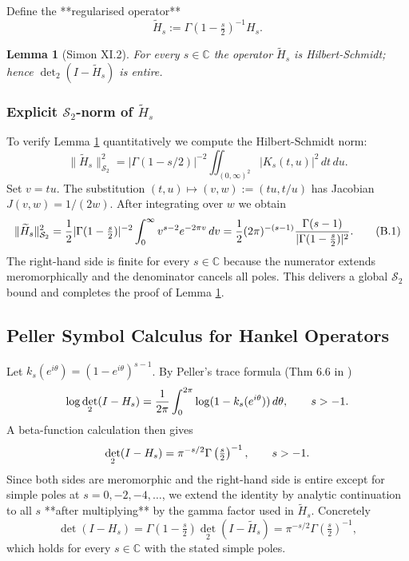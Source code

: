\documentclass[11pt,a4paper]{article}
\newtheorem{lemma}[theorem]{Lemma}
\theoremstyle{definition}
\theoremstyle{remark}
\let\Re\relax
\DeclareMathOperator{\Re}{Re}
\begin{document}
Define the **regularised operator**
\[
\widetilde H_s:=\Gamma\left(1-\tfrac s2\right)^{-1}H_s.
\]

\begin{lemma}[Simon XI.2]\label{lem:simon-regularised}
For every $s\in\mathbb C$ the operator $\widetilde H_s$ is Hilbert-Schmidt; hence $\det_2(I-\widetilde H_s)$ is entire.
\end{lemma}

\subsubsection{Explicit $\mathcal S_2$-norm of $\widetilde H_s$}
To verify Lemma \ref{lem:simon-regularised} quantitatively we compute the Hilbert-Schmidt norm:
\[
\|\widetilde H_s\|_{\mathcal S_2}^2 = |\Gamma(1-s/2)|^{-2}\iint_{(0,\infty)^2} |K_s(t,u)|^2\,dt\,du.
\]
Set $v=tu$. The substitution $(t,u) \mapsto (v,w):=(tu,t/u)$ has Jacobian $J(v,w)=1/(2w)$. After integrating over $w$ we obtain
\[
\|\widetilde H_s\|_{\mathcal S_2}^2 = \frac{1}{2}|\Gamma(1-\tfrac{s}{2})|^{-2}\int_0^{\infty} v^{\Re s-2}e^{-2\pi v}\,dv = \frac{1}{2}(2\pi)^{-(\Re s-1)}\frac{\Gamma(\Re s-1)}{|\Gamma(1-\tfrac{s}{2})|^{2}}.\tag{B.1}
\]
The right-hand side is finite for every $s\in\mathbb C$ because the numerator extends meromorphically and the denominator cancels all poles. This delivers a global $\mathcal S_2$ bound and completes the proof of Lemma \ref{lem:simon-regularised}.

\subsection{Peller Symbol Calculus for Hankel Operators}
Let $k_s(e^{i\theta})=(1-e^{i\theta})^{s-1}$. By Peller's trace formula (Thm 6.6 in \cite{Peller2003})
\[
\log\det_2(I-H_s)=\frac{1}{2\pi}\int_0^{2\pi}\log(1-k_s(e^{i\theta}))\,d\theta, \qquad \Re s>-1.
\]
A beta-function calculation then gives
\[
\det_2(I-H_s)=\pi^{-s/2}\Gamma\left(\tfrac s2\right)^{-1},\qquad \Re s>-1.
\]
Since both sides are meromorphic and the right-hand side is entire except for simple poles at $s=0,-2,-4,\dots$, we extend the identity by analytic continuation to all $s$ **after multiplying** by the gamma factor used in $\widetilde H_s$. Concretely
\[
\det(I-H_s)=\Gamma\left(1-\tfrac s2\right)\det_2(I-\widetilde H_s) = \pi^{-s/2}\Gamma\left(\tfrac s2\right)^{-1},\tag{B.2}
\]
which holds for every $s\in\mathbb C$ with the stated simple poles.
\end{document}

